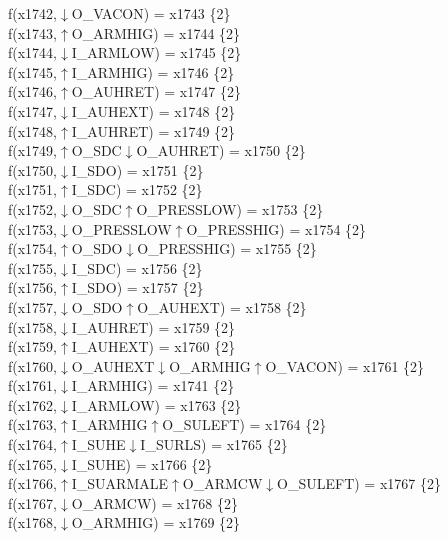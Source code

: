 f(x1742,$\downarrow$O\_VACON) = x1743 \{2\} \\  
f(x1743,$\uparrow$O\_ARMHIG) = x1744 \{2\} \\  
f(x1744,$\downarrow$I\_ARMLOW) = x1745 \{2\} \\  
f(x1745,$\uparrow$I\_ARMHIG) = x1746 \{2\} \\  
f(x1746,$\uparrow$O\_AUHRET) = x1747 \{2\} \\  
f(x1747,$\downarrow$I\_AUHEXT) = x1748 \{2\} \\  
f(x1748,$\uparrow$I\_AUHRET) = x1749 \{2\} \\  
f(x1749,$\uparrow$O\_SDC$\downarrow$O\_AUHRET) = x1750 \{2\} \\  
f(x1750,$\downarrow$I\_SDO) = x1751 \{2\} \\  
f(x1751,$\uparrow$I\_SDC) = x1752 \{2\} \\  
f(x1752,$\downarrow$O\_SDC$\uparrow$O\_PRESSLOW) = x1753 \{2\} \\  
f(x1753,$\downarrow$O\_PRESSLOW$\uparrow$O\_PRESSHIG) = x1754 \{2\} \\  
f(x1754,$\uparrow$O\_SDO$\downarrow$O\_PRESSHIG) = x1755 \{2\} \\  
f(x1755,$\downarrow$I\_SDC) = x1756 \{2\} \\  
f(x1756,$\uparrow$I\_SDO) = x1757 \{2\} \\  
f(x1757,$\downarrow$O\_SDO$\uparrow$O\_AUHEXT) = x1758 \{2\} \\  
f(x1758,$\downarrow$I\_AUHRET) = x1759 \{2\} \\  
f(x1759,$\uparrow$I\_AUHEXT) = x1760 \{2\} \\  
f(x1760,$\downarrow$O\_AUHEXT$\downarrow$O\_ARMHIG$\uparrow$O\_VACON) = x1761 \{2\} \\  
f(x1761,$\downarrow$I\_ARMHIG) = x1741 \{2\} \\  
f(x1762,$\downarrow$I\_ARMLOW) = x1763 \{2\} \\  
f(x1763,$\uparrow$I\_ARMHIG$\uparrow$O\_SULEFT) = x1764 \{2\} \\  
f(x1764,$\uparrow$I\_SUHE$\downarrow$I\_SURLS) = x1765 \{2\} \\  
f(x1765,$\downarrow$I\_SUHE) = x1766 \{2\} \\  
f(x1766,$\uparrow$I\_SUARMALE$\uparrow$O\_ARMCW$\downarrow$O\_SULEFT) = x1767 \{2\} \\  
f(x1767,$\downarrow$O\_ARMCW) = x1768 \{2\} \\  
f(x1768,$\downarrow$O\_ARMHIG) = x1769 \{2\} \\  
